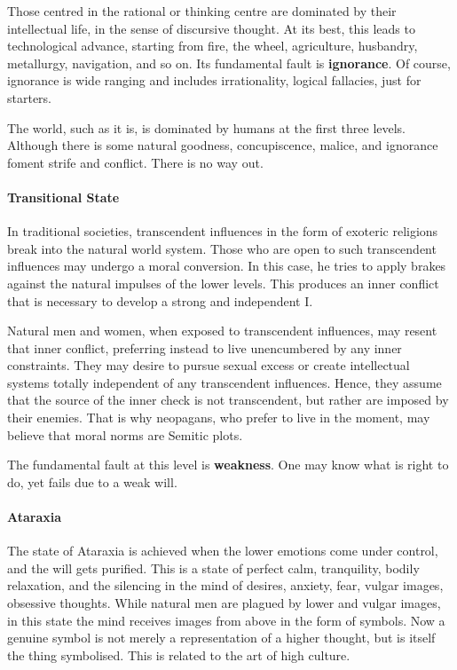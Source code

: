 Those centred in the rational or thinking centre are dominated by their intellectual life, in the sense of discursive thought. At its best, this leads to technological advance, starting from fire, the wheel, agriculture, husbandry, metallurgy, navigation, and so on. Its fundamental fault is \textbf{ignorance}. Of course, ignorance is wide ranging and includes irrationality, logical fallacies, just for starters.

The world, such as it is, is dominated by humans at the first three levels. Although there is some natural goodness, concupiscence, malice, and ignorance foment strife and conflict. There is no way out.

\paragraph{Transitional State}


In traditional societies, transcendent influences in the form of exoteric religions break into the natural world system. Those who are open to such transcendent influences may undergo a moral conversion. In this case, he tries to apply brakes against the natural impulses of the lower levels. This produces an inner conflict that is necessary to develop a strong and independent I.

Natural men and women, when exposed to transcendent influences, may resent that inner conflict, preferring instead to live unencumbered by any inner constraints. They may desire to pursue sexual excess or create intellectual systems totally independent of any transcendent influences. Hence, they assume that the source of the inner check is not transcendent, but rather are imposed by their enemies. That is why neopagans, who prefer to live in the moment, may believe that moral norms are Semitic plots.

The fundamental fault at this level is \textbf{weakness}. One may know what is right to do, yet fails due to a weak will.

\paragraph{Ataraxia}


The state of Ataraxia is achieved when the lower emotions come under control, and the will gets purified. This is a state of perfect calm, tranquility, bodily relaxation, and the silencing in the mind of desires, anxiety, fear, vulgar images, obsessive thoughts. While natural men are plagued by lower and vulgar images, in this state the mind receives images from above in the form of symbols. Now a genuine symbol is not merely a representation of a higher thought, but is itself the thing symbolised. This is related to the art of high culture.

